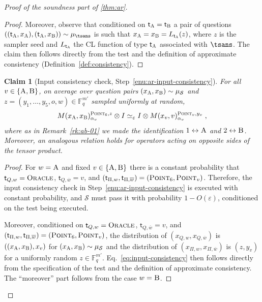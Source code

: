 \documentclass[11pt]{article}
\newtheorem{claim}[theorem]{Claim}
\theoremstyle{definition}
\newcommand{\ol}[1]{\overline{#1}}
\newcommand{\F}{\ensuremath{\mathbb{F}}}
\newcommand{\ot}{\otimes}
\newcommand{\eps}{\varepsilon}
\newcommand{\sampler}{\mathcal{S}}
\newcommand{\strategy}{\mathscr{S}}
\newcommand{\labelstyle}[1]{\ensuremath{\textsc{#1}}\xspace}
\newcommand{\tvarstyle}[1]{\mathsf{#1}}
\newcommand{\tvar}{\ensuremath{\tvarstyle{t}}}
\newcommand{\alice}{\labelstyle{A}}
\newcommand{\bob}{\labelstyle{B}}
\newcommand{\oracle}{\labelstyle{Oracle}}
\newcommand{\typestyle}[1]{\ensuremath{\textsc{#1}}\xspace}
\newcommand{\Point}{\typestyle{Point}}
\begin{document}
\begin{proof}[Proof of the soundness part of \cref{thm:ar}]
\begin{proof}
    Moreover, observe that conditioned on $\tvar_\alice = \tvar_\bob$ a pair of
    questions $((\tvar_\alice,x_\alice),(\tvar_\alice,x_\bob))\sim
    \mu_{\tsans}$ is such that $x_\alice = x_\bob = L_{\tvar_\alice}(z)$,
    where $z$ is the sampler seed and $L_{\tvar_\alice}$ the CL function of type
    $\tvar_\alice$ associated with $\tsans$.
    The claim then follows directly from the test and the definition of
    approximate consistency (Definition~\ref{def:consistency}).
  \end{proof}

  \begin{claim}[Input consistency check, Step~\ref{enu:ar-input-consistency}]
    \label{claim:ar-2}
    For all $v \in \{\alice,\bob\}$, on average over question pairs
    $({x}_\alice, {x}_\bob) \sim \mu_{\sampler}$ and $z=(y_1,\ldots,y_5,o,w)\in
    \F_q^{m'}$ sampled uniformly at random,
    \begin{equation}
      M({x}_\alice, {x}_\bob)^{\Point_6, z}_{\alpha_v} \ot I \simeq_{\eps} I \ot
      M(x_v,v)^{ \Point_v, y_v}_{\alpha_v}\;, \label{eq:input-consistency}
    \end{equation}
    where as in Remark~\ref{rk:ab-01} we made the identification
    $1\leftrightarrow \alice$ and $2\leftrightarrow \bob$.
    Moreover, an analogous relation holds for operators acting on opposite sides
    of the tensor product.
  \end{claim}

	\begin{proof}
    For $w=\alice$ and fixed $v\in\{\alice,\bob\}$ there is a constant
    probability that $\tvar_{Q,w} = \oracle$, $\tvar_{Q,\ol{w}}=v$, and
    $(\tvar_{\Pi,w},\tvar_{\Pi, \ol{w}}) = (\Point_6, \Point_{v})$.
    Therefore, the input consistency check in Step~\ref{enu:ar-input-consistency} is
    executed with constant probability, and $\strategy$ must pass it with
    probability $1-O(\eps)$, conditioned on the test being executed.

    Moreover, conditioned on $\tvar_{Q,w} = \oracle$, $\tvar_{Q,\ol{w}}=v$, and
    $(\tvar_{\Pi,w},\tvar_{\Pi, \ol{w}}) = (\Point_6, \Point_{v})$, the
    distribution of $(x_{Q,w},x_{Q,\overline{w}})$ is $((x_\alice,x_\bob),x_v)$
    for $(x_\alice,x_\bob)\sim \mu_\sampler$ and the distribution of
    $(x_{\Pi,w},x_{\Pi,\overline{w}})$ is $(z,y_v)$ for a uniformly random $z
    \in \F_q^{m'}$.
    Eq.~\eqref{eq:input-consistency} then follows directly from the
    specification of the test and the definition of approximate consistency.
    The ``moreover'' part follows from the case $w=\bob$.
  \end{proof}
	

\end{proof}
\end{document}
